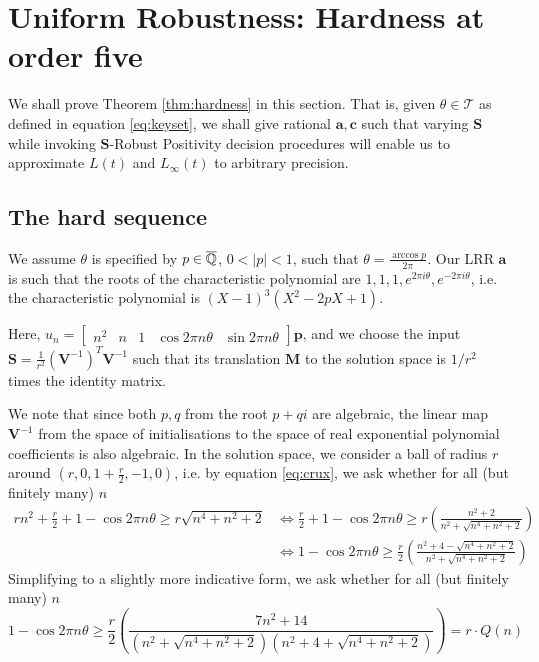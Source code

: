 \section{Uniform Robustness: Hardness at order five}
\label{section:hardness}
We shall prove Theorem \ref{thm:hardness} in this section. That is, given $\theta \in \mathcal{T}$ as defined in equation \ref{eq:keyset}, we shall give rational $\mathbf{a}, \mathbf{c}$ such that varying $\mathbf{S}$ while invoking $\mathbf{S}$-Robust Positivity decision procedures will enable us to approximate $L(t)$ and $L_\infty(t)$ to arbitrary precision.

\subsection{The hard sequence}
We assume $\theta$ is specified by $p \in \overline{\mathbb{Q}}$, $0 < |p| < 1$, such that $\theta = \frac{\arccos p}{2\pi}$. Our LRR $\mathbf{a}$ is such that the roots of the characteristic polynomial are $1, 1, 1, e^{2\pi i\theta}, e^{-2\pi i \theta}$, i.e. the characteristic polynomial is 
$
(X- 1)^3(X^2 - 2pX + 1)
$.

Here, 
$
u_n = \begin{bmatrix}
n^2 & n & 1 & \cos 2\pi n\theta & \sin 2\pi n\theta
\end{bmatrix}
\mathbf{p}
$, and we choose the input $\mathbf{S} = \frac{1}{r^2}(\mathbf{V}^{-1})^T\mathbf{V}^{-1}$ such that its translation $\mathbf{M}$ to the solution space is $1/r^2$ times the identity matrix.

We note that since both $p, q$ from the root $p + qi$ are algebraic, the linear map $\mathbf{V}^{-1}$ from the space of initialisations to the space of real exponential polynomial coefficients is also algebraic. In the solution space, we consider a ball of radius $r$ around $(r, 0, 1+\frac{r}{2}, -1, 0)$, i.e. by equation \ref{eq:crux}, we ask whether for all (but finitely many) $n$
\begin{align*}
rn^2 + \frac{r}{2} + 1 - \cos 2\pi n\theta \ge r\sqrt{n^4 + n^2 + 2} 
&\Leftrightarrow \frac{r}{2} + 1 - \cos 2\pi n\theta \ge r\left(\frac{n^2 + 2}{n^2 + \sqrt{n^4 + n^2 + 2}}\right) \\
&\Leftrightarrow 1 - \cos 2\pi n\theta \ge \frac{r}{2}\left(\frac{n^2 + 4 - \sqrt{n^4 + n^2 + 2}}{n^2 + \sqrt{n^4 + n^2 + 2}}\right)
\end{align*}
Simplifying to a slightly more indicative form, we ask whether for all (but finitely many) $n$
\begin{equation}
\label{eq:pivotal}
1 - \cos 2\pi n\theta \ge \frac{r}{2}\left(\frac{7n^2 + 14}{(n^2 + \sqrt{n^4 + n^2 + 2})(n^2 +4+  \sqrt{n^4 + n^2 + 2})}\right) = r\cdot Q(n)
\end{equation}

